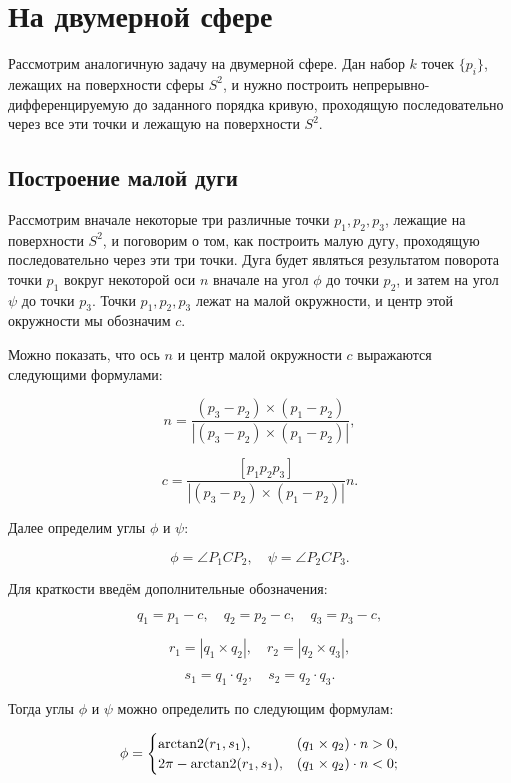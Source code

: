 \section{На двумерной сфере}

Рассмотрим аналогичную задачу на двумерной сфере. Дан набор $k$ точек $\{p_i\}$, лежащих на поверхности сферы $S^2$, и
нужно построить непрерывно-дифференци\-руемую до заданного порядка кривую, проходящую последовательно через все эти
точки и лежащую на поверхности $S^2$.

\subsection*{Построение малой дуги}

Рассмотрим вначале некоторые три различные точки $p_1, p_2, p_3$, лежащие на поверхности $S^2$, и поговорим о
том, как построить малую дугу, проходящую последовательно через эти три точки. Дуга будет являться результатом поворота
точки $p_1$ вокруг некоторой оси $n$ вначале на угол $\phi$ до точки $p_2$, и затем на угол $\psi$ до точки $p_3$.
Точки $p_1, p_2, p_3$ лежат на малой окружности, и центр этой окружности мы обозначим $c$.

Можно показать, что ось $n$ и центр малой окружности $c$ выражаются следующими формулами:

\begin{equation}
n=\frac{(p_3-p_2)\times(p_1-p_2)}{|(p_3-p_2)\times(p_1-p_2)|},
\label{two-dimenstion-sphere-axis}
\end{equation}

$$
c=\frac{[p_1p_2p_3]}{|(p_3-p_2)\times(p_1-p_2)|}n.
$$

Далее определим углы $\phi$ и $\psi$:

$$
\phi=\angle P_1CP_2, \quad \psi=\angle P_2CP_3.
$$

Для краткости введём дополнительные обозначения:

$$
q_1=p_1-c, \quad q_2=p_2-c, \quad q_3=p_3-c,
$$

$$
r_1=|q_1\times q_2|, \quad r_2=|q_2\times q_3|,
$$

$$
s_1=q_1\cdot q_2, \quad s_2=q_2\cdot q_3.
$$

Тогда углы $\phi$ и $\psi$ можно определить по следующим формулам:

\begin{equation}
\phi=
 \begin{cases}
   \operatorname{arctan2}(r_1,s_1),      & (q_1\times q_2)\cdot n>0, \\
   2\pi-\operatorname{arctan2}(r_1,s_1), & (q_1\times q_2)\cdot n<0;
 \end{cases}
\label{two-dimension-sphere-phi-angle}
\end{equation}

